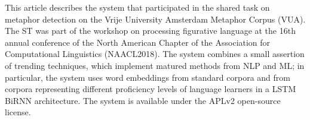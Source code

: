 This article describes the system that participated in the shared task on metaphor detection on the Vrije University Amsterdam Metaphor Corpus (VUA). The ST was part of the workshop on processing figurative language at the 16th annual conference of the North American Chapter of the Association for Computational Linguistics (NAACL2018). The system combines a small assertion of trending techniques, which implement matured methods from NLP and ML; in particular, the system uses word embeddings from standard corpora and from corpora representing different proficiency levels of language learners in a LSTM BiRNN architecture. The system is available under the APLv2 open-source license.
